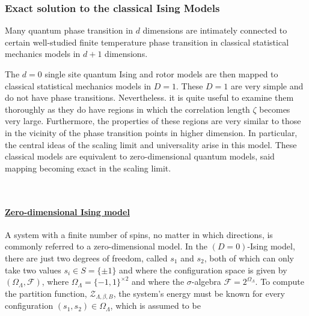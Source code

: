 \documentclass{homework}
\begin{document}

\clearpage

\subsubsection{\textbf{Exact solution to the classical Ising Models}}

Many quantum phase transition in $d$ dimensions are intimately connected to certain well-studied finite temperature phase transition in classical statistical mechanics models in $d+1$ dimensions. \\

\begin{tcolorbox}[colback = my-blue, title = Physical Context]

The $d=0$ single site quantum Ising and rotor models are then mapped to classical statistical mechanics models in $D=1$. These $D=1$ are very simple and do not have phase transitions. Nevertheless. it is quite useful to examine them thoroughly as they do have regions in which the correlation length $\zeta$ becomes very large. Furthermore, the properties of these regions are very similar to those in the vicinity of the phase transition points in higher dimension. In particular, the central ideas of the scaling limit and universality arise in this model. These classical models are equivalent to zero-dimensional quantum models, said mapping becoming exact in the scaling limit. 

\end{tcolorbox}

\blanky \\

\paragraph{\underline{Zero-dimensional Ising model}}

A system with a finite number of spins, no matter in which directions, is commonly referred to a zero-dimensional model. In the $(D=0)$-Ising model, there are just two degrees of freedom, called $s_1$ and $s_2$, both of which can only take two values $s_i \in S = \{\pm 1\}$ and where the configuration space is given by $(\Omega_\Lambda, \mathcal{F})$, where $\Omega_\Lambda = \{-1, 1\}^{\times 2}$ and where the $\sigma$-algebra $\mathcal{F} = 2^{\Omega_\Lambda}$. To compute the partition function, $\mathcal{Z}_{\Lambda, \beta, B}$, the system's energy must be known for every configuration $(s_1, s_2) \in \Omega_{\Lambda}$, which is assumed to be 
\end{document}
